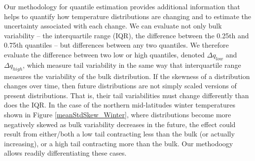 \documentclass{ametsoc}
\begin{document}

Our methodology for quantile estimation provides additional information that helps to
 quantify how temperature distributions are changing and to estimate the uncertainty associated with each change. 
We can evaluate not only bulk variability  -- the interquartile range (IQR), the difference between the 0.25th and 0.75th quantiles -- but differences between any two quantiles. 
We therefore evaluate the difference between two low or high quantiles, denoted $\Delta q_{low}$ and $\Delta q_{high}$, which measure tail variability in the same way that interquartile range measures the variability of the bulk distribution.
If the skewness of a distribution changes over time, then future distributions are not simply scaled versions of present distributions. That is, their tail variabilities must change differently than does the IQR.
  In the case of the northern mid-latitudes winter temperatures shown in Figure \ref{meanStdSkew_Winter}, where distributions become more negatively skewed as bulk variability decreases in the future, the effect could result from either/both a low tail contracting less than the bulk (or actually increasing), or a high tail contracting more than the bulk. Our methodoogy allows readily differentiating these cases.
\end{document}
